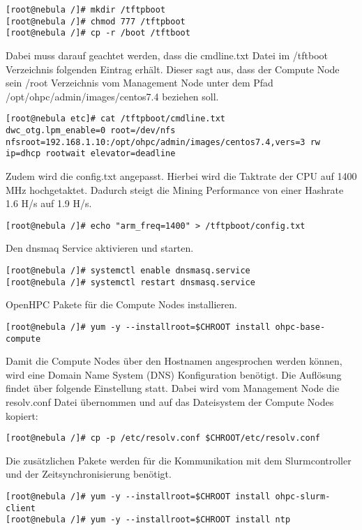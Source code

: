 \begin{lstlisting}
[root@nebula /]# mkdir /tftpboot
[root@nebula /]# chmod 777 /tftpboot
[root@nebula /]# cp -r /boot /tftboot
\end{lstlisting}

Dabei muss darauf geachtet werden, dass die cmdline.txt Datei im /tftboot Verzeichnis folgenden Eintrag erhält. Dieser sagt aus, dass der Compute Node sein /root Verzeichnis vom Management Node unter dem Pfad /opt/ohpc/admin/images/centos7.4 beziehen soll.

\begin{lstlisting}
[root@nebula etc]# cat /tftpboot/cmdline.txt
dwc_otg.lpm_enable=0 root=/dev/nfs nfsroot=192.168.1.10:/opt/ohpc/admin/images/centos7.4,vers=3 rw ip=dhcp rootwait elevator=deadline
\end{lstlisting}

Zudem wird die config.txt angepasst. Hierbei wird die Taktrate der CPU auf 1400 MHz hochgetaktet. Dadurch steigt die Mining Performance von einer Hashrate 1.6 H/s auf 1.9 H/s.

\begin{lstlisting}
[root@nebula /]# echo "arm_freq=1400" > /tftpboot/config.txt
\end{lstlisting}


Den dnsmaq Service aktivieren und starten.
\begin{lstlisting}
[root@nebula /]# systemctl enable dnsmasq.service
[root@nebula /]# systemctl restart dnsmasq.service
\end{lstlisting}

OpenHPC Pakete für die Compute Nodes installieren.
\begin{lstlisting}
[root@nebula /]# yum -y --installroot=$CHROOT install ohpc-base-compute
\end{lstlisting}

Damit die Compute Nodes über den Hostnamen angesprochen werden können, wird eine Domain Name System (DNS) Konfiguration benötigt. Die Auflösung findet über folgende Einstellung statt. Dabei wird vom Management Node die resolv.conf Datei übernommen und auf das Dateisystem der Compute Nodes kopiert:
\begin{lstlisting}
[root@nebula /]# cp -p /etc/resolv.conf $CHROOT/etc/resolv.conf
\end{lstlisting}

Die zusätzlichen Pakete werden für die Kommunikation mit dem Slurmcontroller und der Zeitsynchronisierung benötigt.

\begin{lstlisting}
[root@nebula /]# yum -y --installroot=$CHROOT install ohpc-slurm-client
[root@nebula /]# yum -y --installroot=$CHROOT install ntp
\end{lstlisting}

